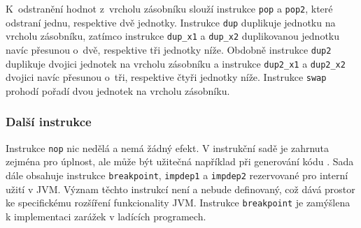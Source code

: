 K~odstranění hodnot z~vrcholu zásobníku slouží instrukce \texttt{pop} a \texttt{pop2}, které odstraní jednu, respektive dvě jednotky. Instrukce \texttt{dup} duplikuje jednotku na vrcholu zásobníku, zatímco instrukce \texttt{dup\_x1} a \texttt{dup\_x2} duplikovanou jednotku navíc přesunou o~dvě, respektive tři jednotky níže. Obdobně instrukce \texttt{dup2} duplikuje dvojici jednotek na vrcholu zásobníku a instrukce \texttt{dup2\_x1} a \texttt{dup2\_x2} dvojici navíc přesunou o~tři, respektive čtyři jednotky níže. Instrukce 
\texttt{swap} prohodí pořadí dvou jednotek na vrcholu zásobníku.

\subsubsection{Další instrukce}

Instrukce \texttt{nop} nic nedělá a nemá žádný efekt. V instrukční sadě je zahrnuta zejména pro úplnost, ale může být užitečná například při generování kódu \cite{}.
Sada dále obsahuje instrukce \texttt{breakpoint}, \texttt{impdep1} a \texttt{impdep2} rezervované pro interní užití v JVM. Význam těchto instrukcí není a nebude definovaný, což dává prostor ke specifickému rozšíření funkcionality JVM. Instrukce \texttt{breakpoint} je zamýšlena k implementaci zarážek v ladících programech. 















